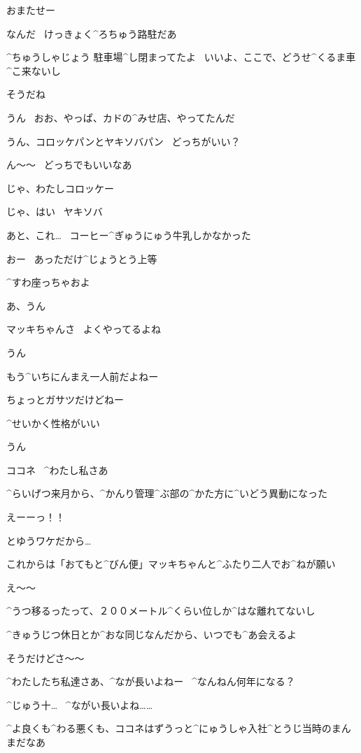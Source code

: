 \page[74]
\K おまたせー

\page
\K なんだ
\ けっきょく^{ろちゅう}{路駐}だあ

\SH ^{ちゅうしゃじょう }{駐車場}^{し}{閉}まってたよ
\ いいよ、ここで、どうせ^{くるま}{車}^{こ}{来}ないし

\K そうだね

\SH うん
\ おお、やっぱ、カドの^{みせ}{店}、やってたんだ

\page
\K うん、コロッケパンとヤキソバパン
\ どっちがいい？

\SH ん〜〜
\ どっちでもいいなあ

\K じゃ、わたしコロッケー

\K じゃ、はい
\ ヤキソバ

\K あと、これ…
\ コーヒー^{ぎゅうにゅう}{牛乳}しかなかった

\SH おー
\ あっただけ^{じょうとう}{上等}

\K ^{すわ}{座}っちゃおよ

\SH あ、うん

\page[78]
\SH マッキちゃんさ
\ よくやってるよね

\K うん

\K もう^{いちにんまえ}{一人前}だよねー

\SH ちょっとガサツだけどねー

\SH ^{せいかく}{性格}がいい

\K うん

\page
\SH ココネ
\ ^{わたし}{私}さあ

\SH ^{らいげつ}{来月}から、^{かんり}{管理}^{ぶ}{部}の^{かた}{方}に^{いどう}{異動}になった

\K えーーっ！！

\SH とゆうワケだから…

\SH これからは「おてもと^{びん}{便}」マッキちゃんと^{ふたり}{二人}でお^{ねが}{願}い

\K え〜〜

\SH ^{うつ}{移}るったって、２００メートル^{くらい}{位}しか^{はな}{離}れてないし

\SH ^{きゅうじつ}{休日}とか^{おな}{同}じなんだから、いつでも^{あ}{会}えるよ

\K そうだけどさ〜〜

\page
\SH ^{わたしたち}{私達}さあ、^{なが}{長}いよねー
\ ^{なんねん}{何年}になる？

\K ^{じゅう}{十}…
\ ^{ながい}{長い}よね……

\page
\SH ^{よ}{良}くも^{わる}{悪}くも、ココネはずうっと^{にゅうしゃ}{入社}^{とうじ}{当時}のまんまだなあ

